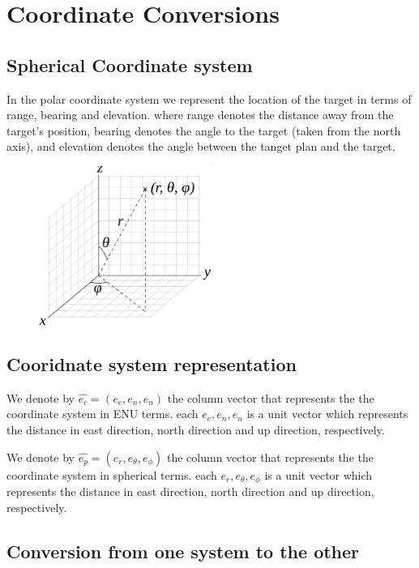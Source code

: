 \documentclass{article}
\newcommand{\east}{e_e}
\newcommand{\north}{e_n}
\newcommand{\up}{e_n}
\newcommand{\range}{e_r}
\newcommand{\bearing}{e_\theta}
\newcommand{\elevation}{e_\phi}
\newcommand{\carvec}{\hat{e_{c}}}
\newcommand{\polvec}{\hat{e_{p}}}
\begin{document}
\section{Coordinate Conversions}

\subsection{Spherical Coordinate system}
In the polar coordinate system we represent the location of the target in terms
of range, bearing and elevation. where range denotes the distance away from the
target's position, bearing denotes the angle to the target (taken from the north
axis), and elevation denotes the angle between the tanget plan and the target.

\begin{figure}[h]\label{fig:spherical}
\includegraphics[width=0.5\textwidth,height=0.5\textheight,keepaspectratio]{figures/spherical}
\end{figure}

\subsection{Cooridnate system representation}

We denote by $\carvec=(\east,\north, \up)$ the column vector that represents
the the coordinate system in ENU terms. each $\east,\north, \up$ is a unit vector
which represents the distance in east direction, north direction and up
direction, respectively.

We denote by $\polvec=(\range,\bearing,\elevation)$ the column vector that
represents the the coordinate system in spherical terms. each $\range,\bearing,\elevation$ is a
unit vector which represents the distance in east direction, north direction and up
direction, respectively.

\subsection{Conversion from one system to the other}
\end{document}
